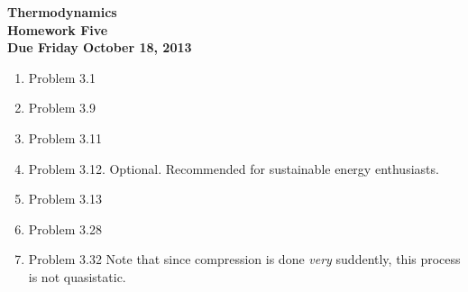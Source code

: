 \documentclass[12pt]{article}
\begin{document}
\pagestyle{empty}
 
\begin{center}
{\large {\bf Thermodynamics}}\\
\medskip
{\large {\bf Homework Five}}\\
\medskip
{ {\bf Due Friday October 18, 2013}}\\
\end{center}


\begin{enumerate}
  \item Problem 3.1
  \item Problem 3.9
  \item Problem 3.11
  \item Problem 3.12.  Optional.  Recommended for sustainable energy
    enthusiasts.  
  \item Problem 3.13
  \item Problem 3.28
  \item Problem 3.32  Note that since compression is done \emph{very}
    suddently, this process is not quasistatic.
\end{enumerate}
\end{document}
